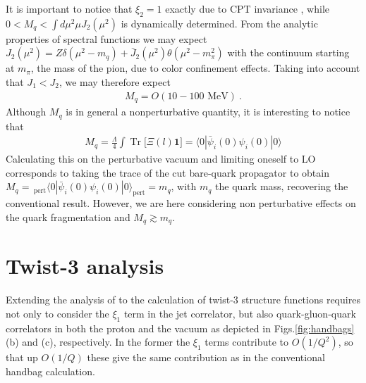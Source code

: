 \documentclass[preprintnumbers,floatfix,nofootinbib]{revtex4}
\newcommand{\todo}[1]{\marginpar{$\bullet$}\textbf{#1}}
\newcommand{\Tr}{\operatorname*{Tr}\nolimits} %
\newcommand{\mj}{M_q}
\newcommand{\mq}{m_q}
\begin{document}
It is important to notice that $\xi_2=1$ exactly due to CPT invariance \cite{Weinberg-book}, while $0 < \mj < \int d\mu^2 \mu J_2(\mu^2)$ is dynamically determined. From the analytic properties of spectral functions we may expect \cite{Accardi:2008ne)} $J_2(\mu^2) = Z \delta(\mu^2-m_q) + \bar J_2 (\mu^2) \theta (\mu^2-m_\pi^2)$ with the continuum starting at $m_\pi$, the mass of the pion, due to color confinement effects. Taking into account that $J_1 < J_2$, we may therefore expect 
\begin{align}
  \label{eq:mjet}
  \mj = O(10-100 \text{ MeV}) \ .
\end{align}
Although $\mj$ is in general a nonperturbative quantity, it is interesting to
notice that  
\begin{align}
  \label{eq:xi2_chiral_cond}
  \mj = \frac{\Lambda}{4} \int \Tr \big[ \Xi(l) \bm 1] 
   = \langle 0 | \bar \psi_i(0) \psi_i(0) | 0 \rangle
\end{align}
Calculating this on the perturbative vacuum and limiting oneself to LO
corresponds to taking the trace of the cut bare-quark propagator to obtain 
$\mj = \,_{\text{pert}} \langle 0
|  \bar \psi_i(0) \psi_i(0) | 0 \rangle_{\text{pert}}  = \mq$, with $\mq$ the quark mass, recovering the
conventional result. However, we are here considering non perturbative effects
on the quark fragmentation and $\mj \gtrsim \mq$. 

\section{Twist-3 analysis}

Extending the analysis of \cite{Accardi:2008ne} to the calculation of twist-3
structure functions requires not only to consider the $\xi_1$ term in the jet
correlator, but also quark-gluon-quark correlators in both the proton and the
vacuum as depicted in Figs.\ref{fig:handbags}(b) and (c), respectively. 
In the former the $\xi_1$ terms contribute to $O(1/Q^2)$, so that up $O(1/Q)$
these give the same contribution as in the conventional handbag calculation.  
\end{document}
